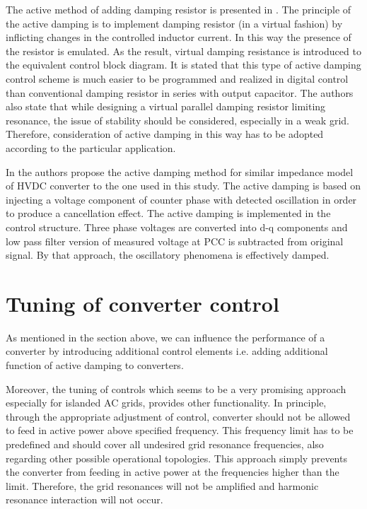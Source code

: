 \documentclass[a4paper,11pt,twoside]{report} %
\begin{document}
The active method of adding damping resistor is presented in \cite{chen2012}. The principle of the active damping is to implement damping resistor (in a virtual fashion) by inflicting changes in the controlled inductor current. In this way the presence of the resistor is emulated. As the result, virtual damping resistance is introduced to the equivalent control block diagram. It is stated that this type of active damping control scheme is much easier to be programmed and realized in digital control than conventional damping resistor in series with output capacitor. The authors also state that while designing a virtual parallel damping resistor limiting resonance, the issue of stability should be considered, especially in a weak grid. Therefore, consideration of active damping in this way has to be adopted according to the particular application.

In \cite{amin2015} the authors propose the active damping method for similar impedance model of HVDC converter to the one used in this study. The active damping \cite{amin2015} is based on injecting a voltage component of counter phase with detected oscillation in order to produce a cancellation effect. The active damping is implemented in the control structure. Three phase voltages are converted into d-q components and low pass filter version of measured voltage at PCC is subtracted from original signal. By that approach, the oscillatory phenomena is effectively damped.

\section{Tuning of converter control}
As mentioned in the section above, we can influence the performance of a converter by introducing additional control elements i.e. adding additional function of active damping to converters.

Moreover, the tuning of controls which seems to be a very promising approach especially for islanded AC grids, provides other functionality. In principle, through the appropriate adjustment of control, converter should not be allowed to feed in active power above specified frequency. This frequency limit has to be predefined and should cover all undesired grid resonance frequencies, also regarding other possible operational topologies. This approach simply prevents the converter from feeding in active power at the frequencies higher than the limit. Therefore, the grid resonances will not be amplified and harmonic resonance interaction will not occur.
\end{document}

